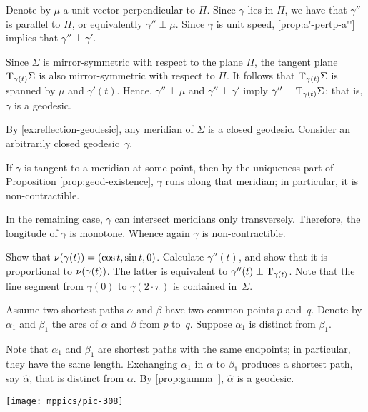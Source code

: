 \begin{multicols}{2}
Denote by $\mu$ a unit vector perpendicular to $\Pi$.
Since $\gamma$ lies in $\Pi$, we have that $\gamma''$ is parallel to $\Pi$, or equivalently $\gamma''\perp \mu$.
Since $\gamma$ is unit speed, \ref{prop:a'-pertp-a''} implies that $\gamma''\perp\gamma'$.

Since $\Sigma$ is mirror-symmetric with respect to the plane $\Pi$,
the tangent plane $\mathrm{T}_{\gamma(t)}\Sigma$ is also mirror-symmetric with respect to $\Pi$.
It follows that $\mathrm{T}_{\gamma(t)}\Sigma$ is spanned by $\mu$ and $\gamma'(t)$.
Hence, $\gamma''\perp \mu$ and $\gamma''\perp\gamma'$ imply $\gamma''\perp\mathrm{T}_{\gamma(t)}\Sigma$;
that is, $\gamma$ is a geodesic.



By \ref{ex:reflection-geodesic}, any meridian of $\Sigma$ is a closed geodesic.
Consider an arbitrarily closed geodesic~$\gamma$.

If $\gamma$ is tangent to a meridian at some point, then by the uniqueness part of Proposition \ref{prop:geod-existence}, $\gamma$ runs along that meridian;
in particular, it is non-contractible.

In the remaining case, $\gamma$ can intersect meridians only transversely.
Therefore, the longitude of $\gamma$ is monotone.
Whence again $\gamma$ is non-contractible.

Show that $\nu(\gamma(t))=(\cos t,\sin t, 0)$.
Calculate $\gamma''(t)$, and show that it is proportional to $\nu(\gamma(t))$.
The latter is equivalent to $\gamma''(t)\perp\mathrm{T}_{\gamma(t)}$. 
Note that the line segment from $\gamma (0) $ to $\gamma (2{\cdot}\pi) $ is contained in~$\Sigma$.

Assume two shortest paths $\alpha$ and $\beta$ have two common points $p$ and~$q$.
Denote by $\alpha_1$ and $\beta_1$ the arcs of $\alpha$ and $\beta$ from $p$ to~$q$.
Suppose $\alpha_1$ is distinct from $\beta_1$.

Note that $\alpha_1$ and $\beta_1$ are shortest paths with the same endpoints;
in particular, they have the same length.
Exchanging $\alpha_1$ in $\alpha$ to $\beta_1$ produces a shortest path, say $\hat\alpha$, that is distinct from $\alpha$.
By \ref{prop:gamma''}, $\hat\alpha$ is a geodesic.

\begin{Figure}
\vskip-0mm
\centering
\texttt{[image: mppics/pic-308]}
\vskip0mm
\end{Figure}


\end{multicols}
